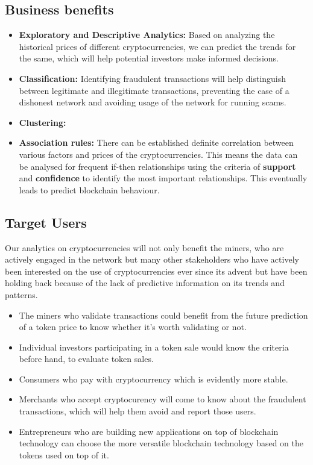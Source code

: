 \documentclass{article}
\begin{document}
\subsection{Business benefits}
\begin{itemize}
    \item \textbf{Exploratory and Descriptive Analytics:} Based on analyzing the historical prices of different cryptocurrencies, we can predict the trends for the same, which will help potential investors make informed decisions.
    \item \textbf{Classification:} Identifying fraudulent transactions will help distinguish between legitimate and illegitimate transactions, preventing the case of a dishonest network and avoiding usage of the network for running scams.
    \item \textbf{Clustering:}
    \item \textbf{Association rules:} There can be established definite correlation between various factors and prices of the cryptocurrencies. This means the data can be analysed for frequent if-then relationships using the criteria of \textbf{support} and \textbf{confidence} to identify the most important relationships. This eventually leads to predict blockchain behaviour.
\end{itemize}
\subsection{Target Users}
Our analytics on cryptocurrencies will not only benefit the miners, who are actively engaged in the network but many other stakeholders who have actively been interested on the use of cryptocurrencies ever since its advent but have been holding back because of the lack of predictive information on its trends and patterns.
\begin{itemize}
    \item The miners who validate transactions could benefit from the future prediction of a token price to know whether it's worth validating or not.
    \item Individual investors participating in a token sale would know the criteria before hand, to evaluate token sales.
    \item Consumers who pay with cryptocurrency which is evidently more stable.
    \item Merchants who accept cryptocurency will come to know about the fraudulent transactions, which will help them avoid and report those users.
    \item Entrepreneurs who are building new applications on top of blockchain technology can choose the more versatile blockchain technology based on the tokens used on top of it. 
\end{itemize}
\end{document}
